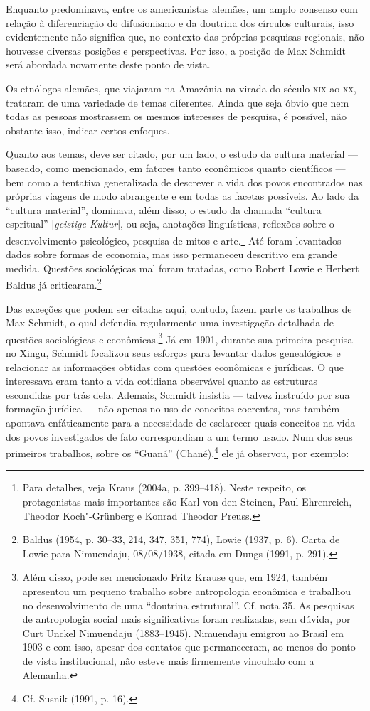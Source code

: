 Enquanto predominava, entre os americanistas alemães, um amplo consenso
com relação à diferenciação do difusionismo e da doutrina dos círculos
culturais, isso evidentemente não significa que, no contexto das
próprias pesquisas regionais, não houvesse diversas posições e
perspectivas. Por isso, a posição de Max Schmidt será abordada
novamente deste ponto de vista.

Os etnólogos alemães, que viajaram na Amazônia na virada do século \textsc{xix}
ao \textsc{xx}, trataram de uma variedade de temas diferentes. Ainda que seja
óbvio que nem todas as pessoas mostrassem os mesmos interesses de
pesquisa, é possível, não obstante isso, indicar certos enfoques.

Quanto aos temas, deve ser citado, por um lado, o estudo da cultura
material --- baseado, como mencionado, em fatores tanto econômicos quanto
científicos --- bem como a tentativa generalizada de descrever a vida dos
povos encontrados nas próprias viagens de modo abrangente e em todas as
facetas possíveis. Ao lado da ``cultura material'', dominava, além
disso, o estudo da chamada ``cultura espritual'' {[}\emph{geistige
Kultur}{]}, ou seja, anotações linguísticas, reflexões sobre o
desenvolvimento psicológico, pesquisa de mitos e arte.\footnote{Para
  detalhes, veja Kraus (2004a, p. 399--418). Neste respeito, os
  protagonistas mais importantes são Karl von den Steinen, Paul
  Ehrenreich, Theodor Koch"-Grünberg e Konrad Theodor Preuss.} Até foram
levantados dados sobre formas de economia, mas isso permaneceu
descritivo em grande medida. Questões sociológicas mal foram tratadas,
como Robert Lowie e Herbert Baldus já criticaram.\footnote{Baldus (1954,
  p. 30--33, 214, 347, 351, 774), Lowie (1937, p. 6). Carta de Lowie para
  Nimuendaju, 08/08/1938, citada em Dungs (1991, p. 291).}

Das exceções que podem ser citadas aqui, contudo, fazem parte os
trabalhos de Max Schmidt, o qual defendia regularmente uma investigação
detalhada de questões sociológicas e econômicas.\footnote{Além disso,
  pode ser mencionado Fritz Krause que, em 1924, também apresentou um
  pequeno trabalho sobre antropologia econômica e trabalhou no
  desenvolvimento de uma ``doutrina estrutural''. Cf. nota 35. As
  pesquisas de antropologia social mais significativas foram realizadas,
  sem dúvida, por Curt Unckel Nimuendaju (1883--1945). Nimuendaju
  emigrou ao Brasil em 1903 e com isso, apesar dos contatos que
  permaneceram, ao menos do ponto de vista institucional, não esteve
  mais firmemente vinculado com a Alemanha.} Já em 1901, durante sua
primeira pesquisa no Xingu, Schmidt focalizou seus esforços para
levantar dados genealógicos e relacionar as informações obtidas com
questões econômicas e jurídicas. O que interessava eram tanto a vida
cotidiana observável quanto as estruturas escondidas por trás dela.
Ademais, Schmidt insistia --- talvez instruído por sua formação jurídica
--- não apenas no uso de conceitos coerentes, mas também apontava
enfáticamente para a necessidade de esclarecer quais conceitos na vida
dos povos investigados de fato correspondiam a um termo usado. Num dos
seus primeiros trabalhos, sobre os ``Guaná'' (Chané),\footnote{Cf.
  Susnik (1991, p. 16).} ele já observou, por exemplo:


